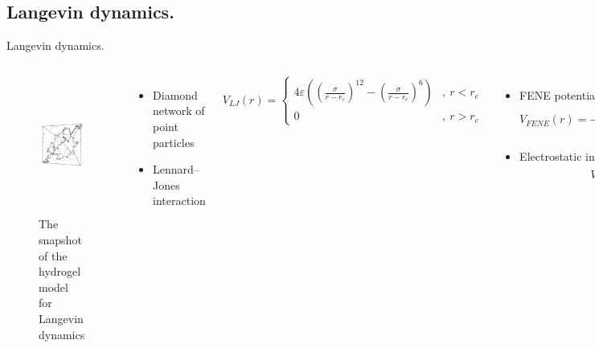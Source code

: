 \documentclass[10pt]{beamer}
\begin{document}
\subsection{Langevin dynamics.}
\begin{frame}{Langevin dynamics. }
	\begin{columns}[T,onlytextwidth]%
			\begin{figure}
				\includegraphics[height=4.5cm]{figures/snapshot_cut.png}
				\caption{The snapshot of the hydrogel model for Langevin dynamics}
			\end{figure}   

		\begin{itemize}
			\item 
				Diamond network of point particles
			\item
				Lennard--Jones interaction
		\end{itemize}
		\begin{equation*}
			V_{LJ}(r) = 
			\begin{cases}
				4\varepsilon\left(\left(\frac{\sigma}{r-r_c}\right)^{12}-\left(\frac{\sigma}{r-r_c}\right)^{6}\right) & ,\ r<r_{c}\\
				0 & ,\ r>r_{c}
			\end{cases}
		\end{equation*}
		\begin{itemize}
			\item FENE potential
			\begin{equation*}
				V_{FENE}(r)=-\frac{1}{2}\Theta\Delta r_{max}^{2}\ln\left[1-\left(\frac{r-r_{0}}{\Delta r_{max}}\right)^{2}\right]
			\end{equation*}
			\item
				Electrostatic interaction
				\begin{equation*}
					V_{EL}=l_{B}k_{B}T\cdot\frac{q_{1}q_{2}}{r}
				\end{equation*}

		\end{itemize}

	\end{columns} %
\end{frame}
\end{document}

